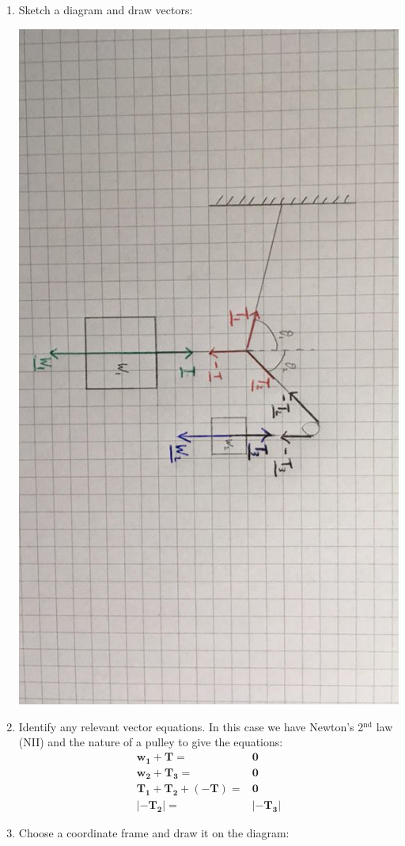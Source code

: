 \documentclass{article}
\renewcommand{\vec}[1]{\bm{#1}}
\newcommand{\vv}[1]{\vec{#1}}
\begin{document}
\begin{enumerate}
\item Sketch a diagram and draw vectors:

\includegraphics[scale=0.2, angle=90]{Diagram2}

\item Identify any relevant vector equations. In this case we have Newton's 2\(^\text{nd}\) law (NII) and the nature of a pulley to give the equations:
\begin{align*}
\vv{w_1}+\vv T=&\vv 0\tag{2.1}\\
\vv{w_2}+\vv{T_3}=&\vv 0\tag{2.2}\\
\vv{T_1}+\vv{T_2}+(-\vv T)=&\vv 0\tag{2.3}\\
|-\vv{T_2}|=&|-\vv{T_3}|\tag{2.4}
\end{align*}
\item Choose a coordinate frame and draw it on the diagram:


\end{enumerate}
\end{document}
